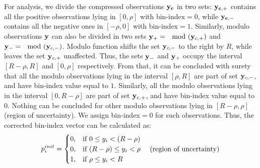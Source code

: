 For analysis, we divide the compressed observations $\mathbf{y_c}$ in two sets: $\mathbf{y_{c,+}}$ contains all the positive observations lying in $[0,\rho]$ with bin-index$=0$, while $\mathbf{y_{c,-}}$ contains all the negative ones in $[-\rho,0]$ with bin-index$=1$. Similarly, modulo observations $\mathbf{y}$ can also be divided in two sets $\mathbf{y}_+ = \mod(\mathbf{y}_{c,+})$ and $\mathbf{y}_- = \mod(\mathbf{y}_{c,-})$. Modulo function shifts the set $\mathbf{y}_{c,-}$ to the right by $R$, while leaves the set $\mathbf{y}_{c,+}$ unaffected. Thus, the sets $\mathbf{y}_-$ and $\mathbf{y}_+$ occupy the interval $[R-\rho,R]$ and $[0,\rho]$ respectively. From that, it can be concluded with surety that all the modulo observations lying in the interval $[\rho, R]$ are part of set $\mathbf{y}_{c,-}$, and have bin-index value equal to $1$. Similarly, all the modulo observations lying in the interval $[0,R-\rho]$ are part of set $\mathbf{y}_{c,+}$, and have bin-index value equal to $0$. Nothing can be concluded for other modulo observations lying in $[R-\rho,\rho]$ (region of uncertainty). We assign bin-index$=0$ for such observations. Thus, the corrected bin-index vector can be calculated as:
\begin{equation}
{p}^{init}_{i} = 
\begin{cases}
0,& \text{if } 0\leq y_i < (R-\rho) \\
0,& \text{if } (R-\rho)\leq y_i < \rho ~~~~ \textnormal{(region of uncertainty)} \\
1,& \text{if } \rho \leq y_i < R \\
\end{cases}
\label{eq:rcm}
\end{equation}
